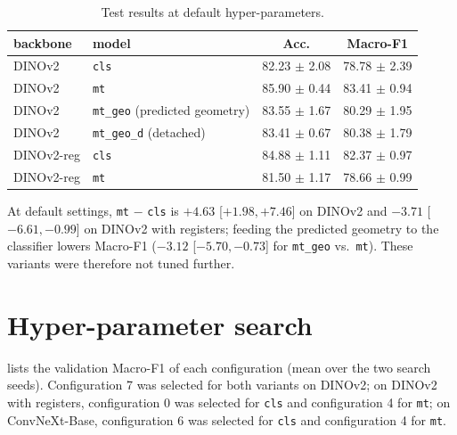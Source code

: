 \documentclass[11pt]{article}
\newcommand{\cls}{\texttt{cls}}
\newcommand{\mt}{\texttt{mt}}
\begin{document}
\begin{table}[!ht]
\centering
\caption{Test results at default hyper-parameters.}
\label{tab:default}
\small
\begin{tabular}{llcc}
\toprule
backbone & model & Acc. & Macro-F1 \\
\midrule
DINOv2     & \cls{}                                & 82.23 $\pm$ 2.08 & 78.78 $\pm$ 2.39 \\
DINOv2     & \mt{}                                 & 85.90 $\pm$ 0.44 & 83.41 $\pm$ 0.94 \\
DINOv2     & \texttt{mt\_geo} (predicted geometry)  & 83.55 $\pm$ 1.67 & 80.29 $\pm$ 1.95 \\
DINOv2     & \texttt{mt\_geo\_d} (detached)         & 83.41 $\pm$ 0.67 & 80.38 $\pm$ 1.79 \\
DINOv2-reg & \cls{}                                & 84.88 $\pm$ 1.11 & 82.37 $\pm$ 0.97 \\
DINOv2-reg & \mt{}                                 & 81.50 $\pm$ 1.17 & 78.66 $\pm$ 0.99 \\
\bottomrule
\end{tabular}
\end{table}

At default settings, \mt{} $-$ \cls{} is $+4.63$ [$+1.98, +7.46$] on DINOv2 and $-3.71$ [$-6.61, -0.99$] on
DINOv2 with registers; feeding the predicted geometry to the classifier lowers Macro-F1 ($-3.12$
[$-5.70, -0.73$] for \texttt{mt\_geo} vs.\ \mt{}). These variants were therefore not tuned further.

\section{Hyper-parameter search}
\label{app:search}
 lists the validation Macro-F1 of each configuration (mean over the two search seeds).
Configuration 7 was selected for both variants on DINOv2; on DINOv2 with registers, configuration 0 was
selected for \cls{} and configuration 4 for \mt{}; on ConvNeXt-Base, configuration 6 was selected for \cls{}
and configuration 4 for \mt{}.
\end{document}
